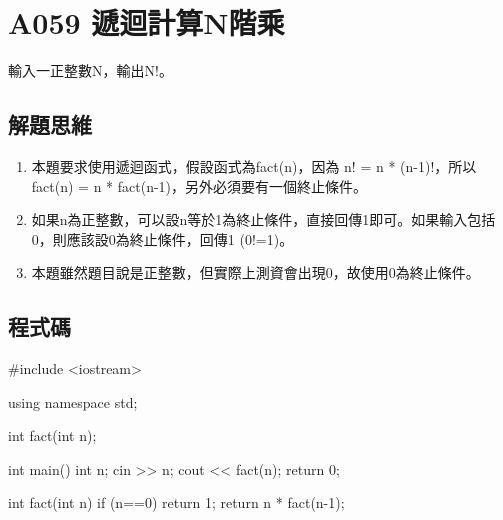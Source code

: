 \section{A059 遞迴計算N階乘}
輸入一正整數N，輸出N!。
\subsection{解題思維}

\begin{enumerate}
	\item 本題要求使用遞迴函式，假設函式為fact(n)，因為 n! = n * (n-1)!，所以 fact(n) = n * fact(n-1)，另外必須要有一個終止條件。
	\item 如果n為正整數，可以設n等於1為終止條件，直接回傳1即可。如果輸入包括0，則應該設0為終止條件，回傳1 (0!=1)。	
	\item 本題雖然題目說是正整數，但實際上測資會出現0，故使用0為終止條件。
\end{enumerate} 

\subsection{程式碼}
\begin{cppcode}
	#include <iostream>

	using namespace std;

	int fact(int n);
	
	int main()
	{
		int n;
		cin >> n;
		cout << fact(n);
		return 0;
	}

	int fact(int n) {
		if (n==0) return 1;
		return n * fact(n-1);
	}
\end{cppcode}
